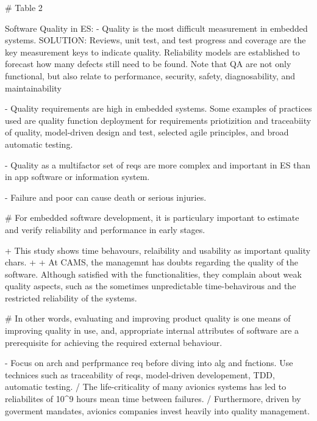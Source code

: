 

# Table 2




Software Quality in ES:
- Quality is the most difficult measurement in embedded systems. SOLUTION: Reviews, unit test, and test progress and coverage are the key measurement keys to indicate quality. Reliability models are established to forecast how many defects still need to be found. Note that QA are not only functional, but also relate to performance, security, safety, diagnosability, and maintainability\cite{ebert2009embedded}

- Quality requirements are high in embedded systems. Some examples of practices used are quality function deployment for requirements priotizition and traceabiity of quality, model-driven design and test, selected agile principles, and broad automatic testing.\cite{ebert2009embedded}

- Quality as a multifactor set of reqs are more complex and important in ES than in app software or information system.\cite{ebert2009embedded}

- Failure and poor can cause death or serious injuries. \cite{ebert2009embedded}

# For embedded software development, it is particulary important to estimate and verify reliability and performance in early stages.\cite{washizaki2007quality}

+ This study shows time behavours, relaibility and usability as important quality chars.\cite{trienekens2010quality}
+ %
+ At CAMS, the managemnt has doubts regarding the quality of the software. Although satisfied with the functionalities, they complain about weak quality aspects, such as the sometimes unpredictable time-behavirous and the restricted reliability of the systems. \cite{trienekens2010quality}


# In other words, evaluating and improving product quality is one means of improving quality in use, and, appropriate internal attributes of software are a prerequisite for achieving the required external behaviour.\cite{washizaki2007quality}

- Focus on arch and perfprmance req before diving into alg and fnctions. Use technices such as traceability of reqs, model-driven developement, TDD, automatic testing.\cite{ebert2009embedded}
/ The life-criticality of many avionics systems has led to reliabilites of 10^9 hours mean time between failures. \cite{pretschner2007software}
/ Furthermore, driven by goverment mandates, avionics companies invest heavily into quality management. \cite{pretschner2007software}



